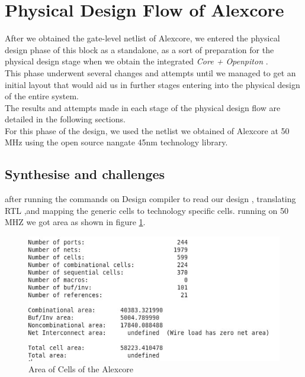 \documentclass[../main.tex]{subfiles}
\begin{document}
\newpage  \section{Physical Design Flow of Alexcore}
After we obtained the gate-level netlist of Alexcore, we entered the physical design phase of this
block as a standalone, as a sort of preparation for the physical design stage when we obtain the
integrated \textit{Core + Openpiton} .\\
This phase underwent several changes and attempts until we managed to get an initial layout that
would aid us in further stages entering into the physical design of the entire system.\\
The results and attempts made in each stage of the physical design flow are detailed in the
following sections.\\
For this phase of the design, we used the netlist we obtained of Alexcore at 50 MHz using the
open source nangate 45nm technology library.
\subsection{Synthesise and challenges}
after running the commands on Design compiler to read our design , translating RTL ,and mapping the generic cells to technology specific cells.
running on 50 MHZ we got area as shown in figure \ref{fig:areasyn}.
\begin{figure}[h]
    \centering
    \includegraphics[width=12cm]{diagrams/areasyn.JPG}
    \caption{Area of Cells of the Alexcore }
    \label{fig:areasyn}
\end{figure}
\end{document}
